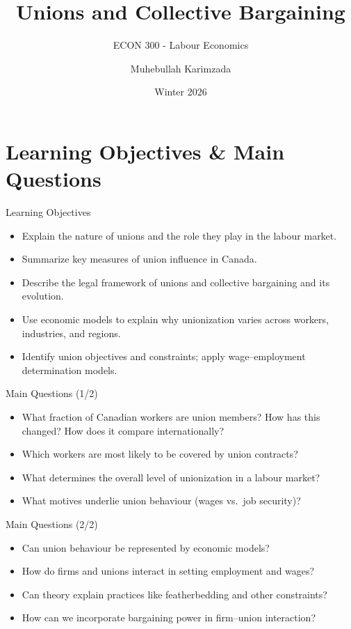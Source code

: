 \documentclass[aspectratio=169]{beamer}
\title{\textbf{Unions and Collective Bargaining \vspace{.5cm}\\  }}
\subtitle{ {\large ECON 300 - Labour Economics}}
\author{Muhebullah Karimzada}
\date{Winter 2026}
\begin{document}
\begin{frame}[plain]
  \titlepage
\end{frame}

\section{Learning Objectives \& Main Questions}

\begin{frame}{Learning Objectives}
\transfade
\begin{itemize}[<+->]
  \item Explain the nature of unions and the role they play in the labour market.
  \item Summarize key measures of union influence in Canada.
  \item Describe the legal framework of unions and collective bargaining and its evolution.
  \item Use economic models to explain why unionization varies across workers, industries, and regions.
  \item Identify union objectives and constraints; apply wage--employment determination models.
\end{itemize}
\end{frame}

\begin{frame}{Main Questions (1/2)}
\transfade
\begin{itemize}[<+->]
  \item What fraction of Canadian workers are union members? How has this changed? How does it compare internationally?
  \item Which workers are most likely to be covered by union contracts?
  \item What determines the overall level of unionization in a labour market?
  \item What motives underlie union behaviour (wages vs.\ job security)?
\end{itemize}
\end{frame}

\begin{frame}{Main Questions (2/2)}
\transfade
\begin{itemize}[<+->]
  \item Can union behaviour be represented by economic models?
  \item How do firms and unions interact in setting employment and wages?
  \item Can theory explain practices like featherbedding and other constraints?
  \item How can we incorporate bargaining power in firm--union interaction?
\end{itemize}
\end{frame}
\end{document}

